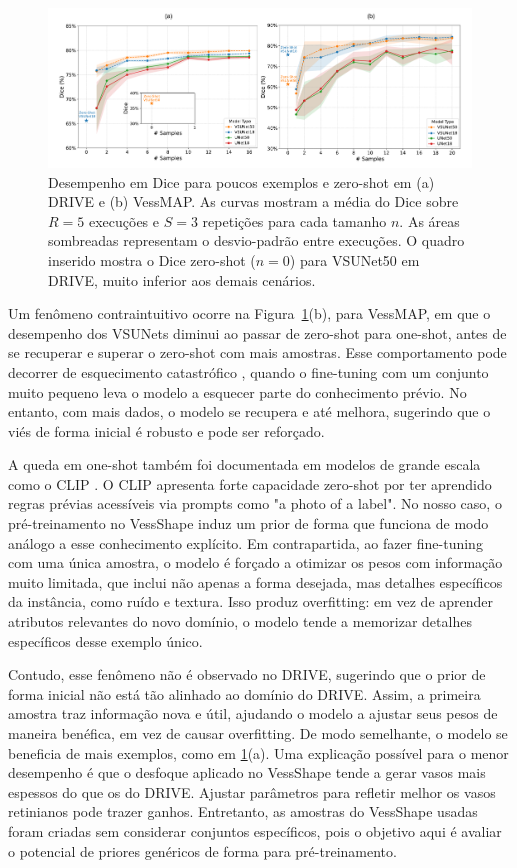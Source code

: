 \documentclass[%
reprint,
nofootinbib,
 amsmath,amssymb,
aps,
floatfix,
superscriptaddress,
showkeys,
longbibliography
]{revtex4-1}
\begin{document}
\begin{figure}[tbp]
    \centering
    \includegraphics[width=\textwidth]{figures/results/results_charts.pdf}
    \caption{Desempenho em Dice para poucos exemplos e zero-shot em (a) DRIVE e (b) VessMAP. As curvas mostram a média do Dice sobre $R{=}5$ execuções e $S{=}3$ repetições para cada tamanho $n$. As áreas sombreadas representam o desvio-padrão entre execuções. O quadro inserido mostra o Dice zero-shot ($n{=}0$) para VSUNet50 em DRIVE, muito inferior aos demais cenários.}
    \label{f:results_charts}
\end{figure}

Um fenômeno contraintuitivo ocorre na Figura~\ref{f:results_charts}(b), para VessMAP, em que o desempenho dos VSUNets diminui ao passar de zero-shot para one-shot, antes de se recuperar e superar o zero-shot com mais amostras. Esse comportamento pode decorrer de esquecimento catastrófico \cite{MCCLOSKEY1989109}, quando o fine-tuning com um conjunto muito pequeno leva o modelo a esquecer parte do conhecimento prévio. No entanto, com mais dados, o modelo se recupera e até melhora, sugerindo que o viés de forma inicial é robusto e pode ser reforçado.

A queda em one-shot também foi documentada em modelos de grande escala como o CLIP \cite{Radford2021LearningTV}. O CLIP apresenta forte capacidade zero-shot por ter aprendido regras prévias acessíveis via prompts como "a photo of a {label}". No nosso caso, o pré-treinamento no VessShape induz um prior de forma que funciona de modo análogo a esse conhecimento explícito. Em contrapartida, ao fazer fine-tuning com uma única amostra, o modelo é forçado a otimizar os pesos com informação muito limitada, que inclui não apenas a forma desejada, mas detalhes específicos da instância, como ruído e textura. Isso produz overfitting: em vez de aprender atributos relevantes do novo domínio, o modelo tende a memorizar detalhes específicos desse exemplo único.

Contudo, esse fenômeno não é observado no DRIVE, sugerindo que o prior de forma inicial não está tão alinhado ao domínio do DRIVE. Assim, a primeira amostra traz informação nova e útil, ajudando o modelo a ajustar seus pesos de maneira benéfica, em vez de causar overfitting. De modo semelhante, o modelo se beneficia de mais exemplos, como em \ref{f:results_charts}(a). Uma explicação possível para o menor desempenho é que o desfoque aplicado no VessShape tende a gerar vasos mais espessos do que os do DRIVE. Ajustar parâmetros para refletir melhor os vasos retinianos pode trazer ganhos. Entretanto, as amostras do VessShape usadas foram criadas sem considerar conjuntos específicos, pois o objetivo aqui é avaliar o potencial de priores genéricos de forma para pré-treinamento.
\end{document}
